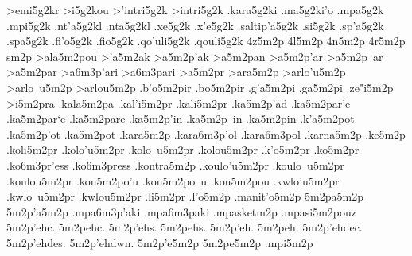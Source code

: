{>emi5g2kr    %
>i5g2kou     %
>'intri5g2k  %
>intri5g2k
.kara5g2ki   %
.ma5g2ki'o   %
.mpa5g2k     %
.mpi5g2k     %
.nt'a5g2kl   %
.nta5g2kl    %
.xe5g2k      %
.x'e5g2k
.saltip'a5g2k %
.si5g2k      %
.sp'a5g2k    %
.spa5g2k
.fi'o5g2k    %
.fio5g2k
.qo'uli5g2k  %
.qouli5g2k
4z5m2p
4l5m2p
4n5m2p
4r5m2p
sm2p
>ala5m2pou   %
>'a5m2ak     %
>a5m2p'ak
>a5m2pan     %
>a5m2p'ar    %
>a5m2p~ar
>a5m2par
  >a6m3p'ari   %
  >a6m3pari
>a5m2pr      %
>ara5m2p     %
>arlo'u5m2p  %
>arlo~u5m2p
>arlou5m2p
.b'o5m2pir   %
.bo5m2pir    %
.g'a5m2pi    %
.ga5m2pi
.ze"i5m2p    %
>i5m2pra     %
.kala5m2pa   %
.kal'i5m2pr  %
.kali5m2pr  
.ka5m2p'ad   %
.ka5m2par'e  %
.ka5m2par`e
.ka5m2pare
.ka5m2p'in   %
.ka5m2p~in
.ka5m2pin
.k'a5m2pot   %
.ka5m2p'ot
.ka5m2pot
.kara5m2p    %
  .kara6m3p'ol %
  .kara6m3pol
.karna5m2p   %
.ke5m2p      %
.koli5m2pr   %
.kolo'u5m2pr %
.kolo~u5m2pr
.kolou5m2pr
.k'o5m2pr    %
.ko5m2pr
  .ko6m3pr'ess %
  .ko6m3press
.kontra5m2p  %
.koulo'u5m2pr %
.koulo~u5m2pr
.koulou5m2pr
.kou5m2po'u  %
.kou5m2po~u
.kou5m2pou
.kwlo'u5m2pr %
.kwlo~u5m2pr
.kwlou5m2pr
.li5m2pr     %
.l'o5m2p     %
.manit'o5m2p %
5m2pa5m2p    %
5m2p'a5m2p   %
  .mpa6m3p'aki %
  .mpa6m3paki
.mpasketm2p  %
.mpasi5m2pouz %
5m2p'ehc.    %
5m2pehc.
5m2p'ehs.
5m2pehs.
5m2p'eh.
5m2peh.
5m2p'ehdec.
5m2p'ehdes.
5m2p'ehdwn.
5m2p'e5m2p   %
5m2pe5m2p
.mpi5m2p     %
}

